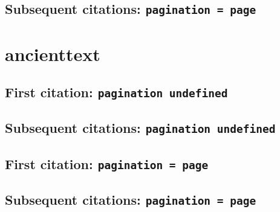 \documentclass[a4paper]{article}
\begin{document}
\subsection{Subsequent citations: \texttt{pagination = page}}

\cite{stendahl:1962:a}

\cite[577]{stendahl:1962:a}

\cite[note]{stendahl:1962:a}

\section{ancienttext}

\subsection{First citation: \texttt{pagination undefined}}

\cite{greathymnaten}

\citereset
\cite[44]{greathymnaten}

\citereset
\cite[note]{greathymnaten}

\subsection{Subsequent citations: \texttt{pagination undefined}}

\cite{greathymnaten}

\cite[44]{greathymnaten}

\AtNextCite{\renewcommand*{\volcitedelim}{\addcomma\space}}
\cite[note]{greathymnaten}

\subsection{First citation: \texttt{pagination = page}}

\cite{greathymnaten:a}

\citereset
\cite[44]{greathymnaten:a}

\citereset
\cite[note]{greathymnaten:a}

\subsection{Subsequent citations: \texttt{pagination = page}}

\cite{greathymnaten:a}

\cite[44]{greathymnaten:a}

\cite[note]{greathymnaten:a}
\end{document}
